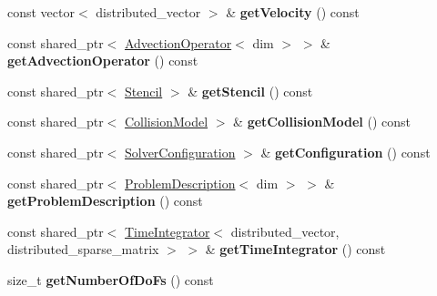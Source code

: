 \begin{DoxyCompactItemize}
\item 
\hypertarget{classnatrium_1_1CFDSolver_a0e5ec3dc278216d5827410b7db82af59}{
const vector$<$ distributed\_\-vector $>$ \& {\bfseries getVelocity} () const }
\label{classnatrium_1_1CFDSolver_a0e5ec3dc278216d5827410b7db82af59}

\item 
\hypertarget{classnatrium_1_1CFDSolver_a1aea207c81089c2e46092489557bb139}{
const shared\_\-ptr$<$ \hyperlink{classnatrium_1_1AdvectionOperator}{AdvectionOperator}$<$ dim $>$ $>$ \& {\bfseries getAdvectionOperator} () const }
\label{classnatrium_1_1CFDSolver_a1aea207c81089c2e46092489557bb139}

\item 
\hypertarget{classnatrium_1_1CFDSolver_a2006f7bbbf2336789a5cd74d329c2e60}{
const shared\_\-ptr$<$ \hyperlink{classnatrium_1_1Stencil}{Stencil} $>$ \& {\bfseries getStencil} () const }
\label{classnatrium_1_1CFDSolver_a2006f7bbbf2336789a5cd74d329c2e60}

\item 
\hypertarget{classnatrium_1_1CFDSolver_abb4b632b524bd68afcdff7d54c2d3d97}{
const shared\_\-ptr$<$ \hyperlink{classnatrium_1_1CollisionModel}{CollisionModel} $>$ \& {\bfseries getCollisionModel} () const }
\label{classnatrium_1_1CFDSolver_abb4b632b524bd68afcdff7d54c2d3d97}

\item 
\hypertarget{classnatrium_1_1CFDSolver_a413691491ac82f384a03293be2294de5}{
const shared\_\-ptr$<$ \hyperlink{classnatrium_1_1SolverConfiguration}{SolverConfiguration} $>$ \& {\bfseries getConfiguration} () const }
\label{classnatrium_1_1CFDSolver_a413691491ac82f384a03293be2294de5}

\item 
\hypertarget{classnatrium_1_1CFDSolver_a8b1131e8fd6b022bea5ddce72469c289}{
const shared\_\-ptr$<$ \hyperlink{classnatrium_1_1ProblemDescription}{ProblemDescription}$<$ dim $>$ $>$ \& {\bfseries getProblemDescription} () const }
\label{classnatrium_1_1CFDSolver_a8b1131e8fd6b022bea5ddce72469c289}

\item 
\hypertarget{classnatrium_1_1CFDSolver_af1b1ca6771029003bc9bac7cfe0b4d3c}{
const shared\_\-ptr$<$ \hyperlink{classnatrium_1_1TimeIntegrator}{TimeIntegrator}$<$ distributed\_\-vector, distributed\_\-sparse\_\-matrix $>$ $>$ \& {\bfseries getTimeIntegrator} () const }
\label{classnatrium_1_1CFDSolver_af1b1ca6771029003bc9bac7cfe0b4d3c}

\item 
\hypertarget{classnatrium_1_1CFDSolver_a74d459ef4f43d42e04ceb2178bb006f4}{
size\_\-t {\bfseries getNumberOfDoFs} () const }
\label{classnatrium_1_1CFDSolver_a74d459ef4f43d42e04ceb2178bb006f4}


\end{DoxyCompactItemize}

